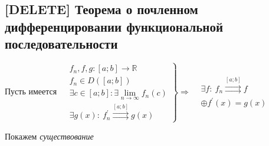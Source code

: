 \documentclass[a4paper]{article}
\begin{document}
\subsection{[DELETE] Теорема о почленном дифференцировании функциональной последовательности}
\theorem Пусть имеется $\left.\begin{aligned}
    &f_n,f,g:[a;b]\to\mathbb{R}\\
    &f_n\in D([a;b])\\
    &\exists c\in[a;b]:\exists\lim\limits_{n\to\infty} f_n(c)\\
    &\exists g(x):\ f^{\prime}_n\overset{[a;b]}{\rightrightarrows}g(x)
\end{aligned}\right\}\Longrightarrow \begin{aligned}
    &\exists f:\ f_n\overset{[a;b]}{\rightrightarrows}f\\
    &\oplus f^{\prime}(x)=g(x)
\end{aligned}$

\proof Покажем \textit{существование}
    
\end{document}
